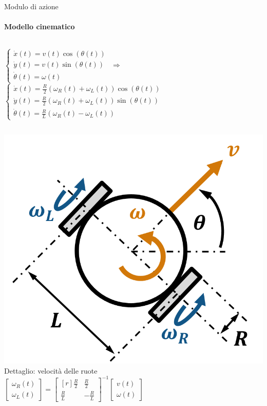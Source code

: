\documentclass[handout]{beamer}
\begin{document}
\renewcommand{\arraystretch}{1.5}
\begin{frame}{Modulo di azione}
\framesubtitle{Modello cinematico}
\begin{columns}
\centering
$
\begin{cases}
\dot{x}(t) = v(t)\cos(\theta(t)) \\
\dot{y}(t) = v(t)\sin(\theta(t)) \\
\dot{\theta}(t) = \omega(t)
\end{cases}
$
\centering
$\Rightarrow$
\centering
$
\begin{cases}
\dot{x}(t) = \frac{R}{2} \left( \omega_R(t)+\omega_L(t) \right) \cos(\theta(t)) \\
\dot{y}(t) = \frac{R}{2} \left( \omega_R(t)+\omega_L(t) \right)\sin(\theta(t)) \\
\dot{\theta}(t) = \frac{R}{L} \left( \omega_R(t)-\omega_L(t) \right)
\end{cases}
$
\end{columns}
\vspace{5mm}
\begin{columns}
\includegraphics[width=\textwidth]{DD.png}
\centering
Dettaglio: velocità delle ruote \\
$
{\begin{bmatrix}
\omega_R(t) \\
\omega_L(t)
\end{bmatrix} =
\begin{bmatrix*}[r]
\frac{R}{2} & \frac{R}{2} \\
\frac{R}{L} & -\frac{R}{L}
\end{bmatrix*}^{-1}
\begin{bmatrix}
v(t) \\
\omega(t)
\end{bmatrix}}$
\end{columns}
\end{frame}
\end{document}
